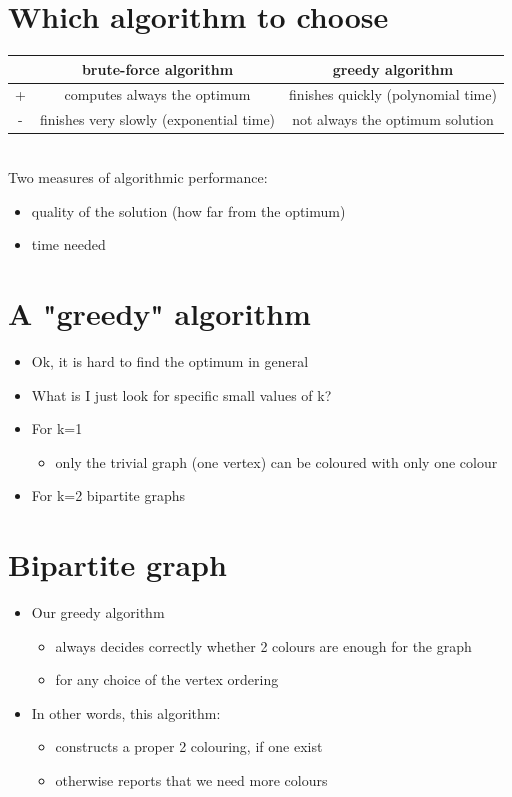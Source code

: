 \documentclass{article}[18pt]
\begin{document}
\section{Which algorithm to choose}
\begin{tabular}{|c|c|c|}
\hline 
 & brute-force algorithm & greedy algorithm \\ 
\hline 
+ & computes always the optimum & finishes quickly (polynomial time) \\ 
\hline 
- & finishes very slowly (exponential time) & not always the optimum solution \\ 
\hline 
\end{tabular} \\
Two measures of algorithmic performance:
\begin{itemize}
\item quality of the solution (how far from the optimum)
\item time needed
\end{itemize}
\section{A "greedy" algorithm}
\begin{itemize}
	\item Ok, it is hard to find the optimum in general
	\item What is I just look for specific small values of k?
	\item For k=1
	\begin{itemize}
		\item only the trivial graph (one vertex) can be coloured with only one colour
	\end{itemize}
	\item For k=2 bipartite graphs
\end{itemize}
\section{Bipartite graph}
\begin{itemize}
	\item Our greedy algorithm
	\begin{itemize}
		\item always decides correctly whether 2 colours are enough for the graph
		\item for any choice of the vertex ordering
	\end{itemize}
	\item In other words, this algorithm:
	\begin{itemize}
		\item constructs a proper 2 colouring, if one exist
		\item otherwise reports that we need more colours
	\end{itemize}
\end{itemize}
\end{document}
